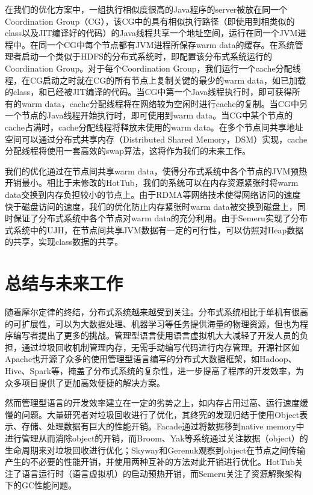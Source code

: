 \documentclass[lang=cn,12pt,a4paper,cite=authoryear]{elegantpaper}
\begin{document}
\begin{figure*}[!htp]
\begin{figure*}[!htp]
\begin{figure*}[!htp]
在我们的优化方案中，一组执行相似度很高的Java程序的server被放在同一个Coordination Group（CG），该CG中的具有相似执行路径（即使用到相类似的class以及JIT编译好的代码）的Java线程共享一个地址空间，运行在同一个JVM进程中。在同一个CG中每个节点都有JVM进程所保存warm data的缓存。在系统管理者启动一个类似于HDFS的分布式系统时，即配置该分布式系统运行的Coordination Group。对于每个Coordination Group，我们运行一个cache分配线程，在CG启动之时就在CG的所有节点上复制关键的最少的warm data，如已加载的class，和已经被JIT编译的代码。当CG中第一个Java线程执行时，即可获得所有的warm data，cache分配线程将在网络较为空闲时进行cache的复制。当CG中另一个节点的Java线程开始执行时，即可使用到warm data。当CG中某个节点的cache占满时，cache分配线程将释放未使用的warm data。在多个节点间共享地址空间可以通过分布式共享内存\cite{DBLP:journals/ieeecc/ProticTM96}（Distributed Shared Memory，DSM）实现，cache分配线程将使用一套高效的swap算法，这将作为我们的未来工作。

我们的优化通过在节点间共享warm data，使得分布式系统中各个节点的JVM预热开销最小。相比于未修改的HotTub，我们的系统可以在内存资源紧张时将warm data交换到内存负担较小的节点上。由于RDMA等网络技术使得网络访问的速度快于磁盘访问的速度，我们的优化防止内存紧张时warm data被交换到磁盘上，同时保证了分布式系统中各个节点对warm data的充分利用。由于Semeru实现了分布式系统中的UJH，在节点间共享JVM数据有一定的可行性，可以仿照对Heap数据的共享，实现class数据的共享。

\section{总结与未来工作}

随着摩尔定律的终结，分布式系统越来越受到关注。分布式系统相比于单机有很高的可扩展性，可以为大数据处理、机器学习等任务提供海量的物理资源，但也为程序编写者提出了更多的挑战。管理型语言使用语言虚拟机大大减轻了开发人员的负担，通过垃圾回收机制管理内存，无需手动编写代码进行内存管理。开源社区如Apache也开源了众多的使用管理型语言编写的分布式大数据框架，如Hadoop、Hive、Spark等，掩盖了分布式系统的复杂性，进一步提高了程序的开发效率，为众多项目提供了更加高效便捷的解决方案。

然而管理型语言的开发效率建立在一定的劣势之上，如内存占用过高、运行速度缓慢的问题。大量研究者对垃圾回收进行了优化，其终究的发现归结于使用Object表示、存储、处理数据有巨大的性能开销。Facade通过将数据移到native memory中进行管理从而消除object的开销，而Broom、Yak等系统通过关注数据（object）的生命周期来对垃圾回收进行优化；Skyway和Gerenuk观察到object在节点之间传输产生的不必要的性能开销，并使用两种互补的方法对此开销进行优化。HotTub关注了语言运行时（语言虚拟机）的启动预热开销，而Semeru关注了资源解聚架构下的GC性能问题。


\end{figure*}
\end{figure*}
\end{figure*}
\end{document}
